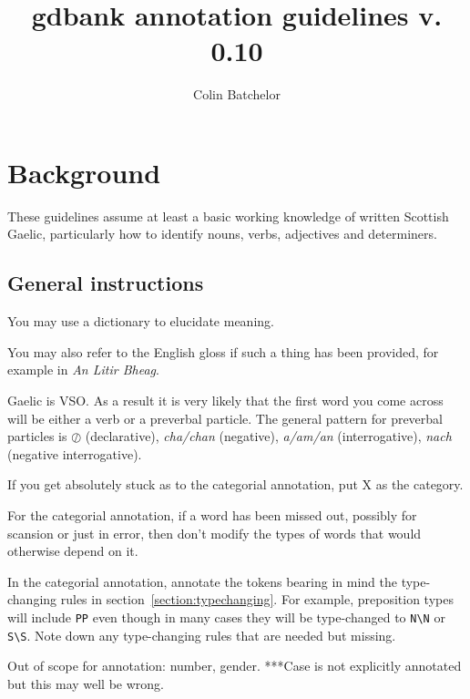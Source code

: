 \documentclass[a4paper]{article}
\begin{document}
\title{gdbank annotation guidelines v. 0.10}
\author{Colin Batchelor}
\maketitle

\tableofcontents

\section{Background}

These guidelines assume at least a basic working knowledge of written Scottish Gaelic, particularly how to identify nouns, verbs, adjectives and determiners.

\subsection{General instructions}

 You may use a dictionary to elucidate meaning.

 You may also refer to the English gloss if such a thing has been provided, for example in {\it An Litir Bheag}.

 Gaelic is VSO. As a result it is very likely that the first word you come across will be either a verb or a preverbal particle.
The general pattern for preverbal particles is $\oslash$ (declarative), \textit{cha/chan} (negative), \textit{a/am/an} (interrogative), \textit{nach} (negative interrogative).

 If you get absolutely stuck as to the categorial annotation, put X as the category.

 For the categorial annotation, if a word has been missed out, possibly for scansion or just in error, then don't modify the types of words that would otherwise depend on it.

 In the categorial annotation, annotate the tokens bearing in mind the type-changing rules in section~\ref{section:typechanging}. For example, preposition types will include \texttt{PP} even though in many cases they will be type-changed to \texttt{N\textbackslash N} or \texttt{S\textbackslash S}. Note down any type-changing rules that are needed but missing.

 Out of scope for annotation: number, gender.
***Case is not explicitly annotated but this may well be wrong.
\end{document}
